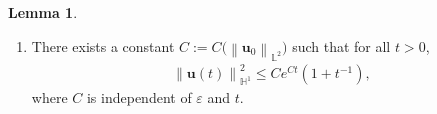 \documentclass[11pt, reqno]{amsart}
\theoremstyle{definition}
\newtheorem{lemma}[theorem]{Lemma}
\numberwithin{equation}{section}
\newcommand{\bff}{\boldsymbol}
\newcommand{\bb}{\mathbb}
\newcommand{\ds}{\mathrm{d}s}
\newcommand{\norm}[2]{\left\|{#1}\right\|_{#2}}
\begin{document}
\begin{lemma}
\begin{enumerate}
\begin{align}
        \end{align}
        where $\widetilde{\rho_1}$ is independent of $\bff{u}_0$, $\varepsilon$, and $t$.
    \item There exists a constant $C:= C\big(\norm{\bff{u}_0}{\bb{L}^2}\big)$ such that for all $t>0$,
        \begin{align}\label{equ:M0 u H1}
            \norm{\bff{u}(t)}{\bb{H}^1}^2
            \leq
            Ce^{Ct} \left(1+t^{-1}\right),
        \end{align}
    where $C$ is independent of $\varepsilon$ and $t$.
\end{enumerate}
\end{lemma}
\end{document}
